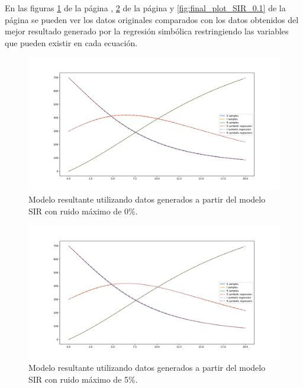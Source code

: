 En las figuras \ref{fig:final_plot_SIR_0.0} de la página \pageref{fig:final_plot_SIR_0.0}, \ref{fig:final_plot_SIR_0.05} de la página \pageref{fig:final_plot_SIR_0.05} y \ref{fig:final_plot_SIR_0.1} de la página \pageref{fig:final_plot_SIR_0.1} se pueden ver los datos originales comparados con los datos obtenidos del mejor resultado generado por la regresión simbólica restringiendo las variables que pueden existir en cada ecuación.

\begin{figure}[h]
    \centering
    \includegraphics[width=\textwidth]{"figures/final_plot_SIR_0.0.pdf"}
    \caption{Modelo resultante utilizando datos generados a partir del modelo SIR con ruido máximo de 0\%.}
    \label{fig:final_plot_SIR_0.0}
\end{figure}

\begin{figure}[h]
    \centering
    \includegraphics[width=\textwidth]{"figures/final_plot_SIR_0.05.pdf"}
    \caption{Modelo resultante utilizando datos generados a partir del modelo SIR con ruido máximo de 5\%.}
    \label{fig:final_plot_SIR_0.05}
\end{figure}

